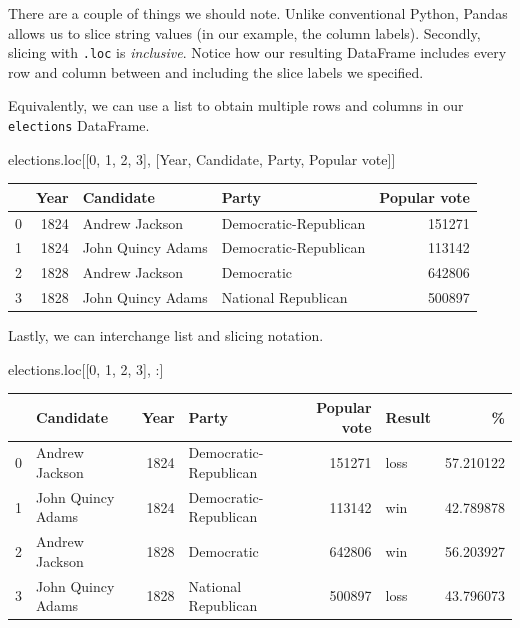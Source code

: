 \documentclass[
  letterpaper,
  DIV=11,
  numbers=noendperiod]{scrreprt}
\newenvironment{Shaded}{\begin{snugshade}}{\end{snugshade}}
\newcommand{\DecValTok}[1]{\textcolor[rgb]{0.68,0.00,0.00}{#1}}
\newcommand{\NormalTok}[1]{\textcolor[rgb]{0.00,0.23,0.31}{#1}}
\newcommand{\StringTok}[1]{\textcolor[rgb]{0.13,0.47,0.30}{#1}}
\begin{document}
There are a couple of things we should note. Unlike conventional Python,
Pandas allows us to slice string values (in our example, the column
labels). Secondly, slicing with \texttt{.loc} is \emph{inclusive}.
Notice how our resulting DataFrame includes every row and column between
and including the slice labels we specified.

Equivalently, we can use a list to obtain multiple rows and columns in
our \texttt{elections} DataFrame.

\begin{Shaded}
\begin{Highlighting}[]
\NormalTok{elections.loc[[}\DecValTok{0}\NormalTok{, }\DecValTok{1}\NormalTok{, }\DecValTok{2}\NormalTok{, }\DecValTok{3}\NormalTok{], [}\StringTok{\textquotesingle{}Year\textquotesingle{}}\NormalTok{, }\StringTok{\textquotesingle{}Candidate\textquotesingle{}}\NormalTok{, }\StringTok{\textquotesingle{}Party\textquotesingle{}}\NormalTok{, }\StringTok{\textquotesingle{}Popular vote\textquotesingle{}}\NormalTok{]]}
\end{Highlighting}
\end{Shaded}

\begin{tabular}{lrllr}
\toprule
{} &  Year &          Candidate &                  Party &  Popular vote \\
\midrule
0 &  1824 &     Andrew Jackson &  Democratic-Republican &        151271 \\
1 &  1824 &  John Quincy Adams &  Democratic-Republican &        113142 \\
2 &  1828 &     Andrew Jackson &             Democratic &        642806 \\
3 &  1828 &  John Quincy Adams &    National Republican &        500897 \\
\bottomrule
\end{tabular}

Lastly, we can interchange list and slicing notation.

\begin{Shaded}
\begin{Highlighting}[]
\NormalTok{elections.loc[[}\DecValTok{0}\NormalTok{, }\DecValTok{1}\NormalTok{, }\DecValTok{2}\NormalTok{, }\DecValTok{3}\NormalTok{], :]}
\end{Highlighting}
\end{Shaded}

\begin{tabular}{llrlrlr}
\toprule
{} &          Candidate &  Year &                  Party &  Popular vote & Result &          \% \\
\midrule
0 &     Andrew Jackson &  1824 &  Democratic-Republican &        151271 &   loss &  57.210122 \\
1 &  John Quincy Adams &  1824 &  Democratic-Republican &        113142 &    win &  42.789878 \\
2 &     Andrew Jackson &  1828 &             Democratic &        642806 &    win &  56.203927 \\
3 &  John Quincy Adams &  1828 &    National Republican &        500897 &   loss &  43.796073 \\
\bottomrule
\end{tabular}
\end{document}
